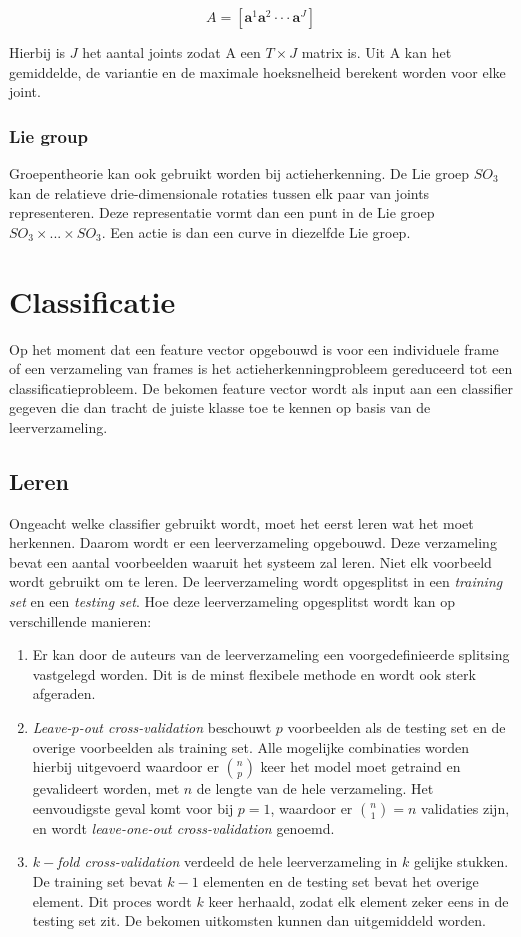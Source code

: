 $$A = [\textbf{a}^1\textbf{a}^2 \cdot\cdot\cdot \textbf{a}^J]$$

Hierbij is $J$ het aantal joints zodat A een $T \times J$ matrix is. Uit A kan het gemiddelde, de variantie en de maximale hoeksnelheid berekent worden voor elke joint. 

\subsection{Lie group}
Groepentheorie kan ook gebruikt worden bij actieherkenning. De Lie groep $SO_3$ kan de relatieve drie-dimensionale rotaties tussen elk paar van joints representeren. Deze representatie vormt dan een punt in de Lie groep $SO_3 \times ... \times SO_3$. Een actie is dan een curve in diezelfde Lie groep.


\chapter{Classificatie}
Op het moment dat een feature vector opgebouwd is voor een individuele frame of een verzameling van frames is het actieherkenningprobleem gereduceerd tot een classificatieprobleem. De bekomen feature vector wordt als input aan een classifier gegeven die dan tracht de juiste klasse toe te kennen op basis van de leerverzameling. 

\section{Leren}
Ongeacht welke classifier gebruikt wordt, moet het eerst leren wat het moet herkennen. Daarom wordt er een leerverzameling opgebouwd. Deze verzameling bevat een aantal voorbeelden waaruit het systeem zal leren. Niet elk voorbeeld wordt gebruikt om te leren. De leerverzameling wordt opgesplitst in een \textit{training set} en een \textit{testing set}. Hoe deze leerverzameling opgesplitst wordt kan op verschillende manieren:
\begin{enumerate}
	\item Er kan door de auteurs van de leerverzameling een voorgedefinieerde splitsing vastgelegd worden. Dit is de minst flexibele methode en wordt ook sterk afgeraden. 
	\item \textit{Leave-$p$-out cross-validation} beschouwt $p$ voorbeelden als de testing set en de overige voorbeelden als training set. Alle mogelijke combinaties worden hierbij uitgevoerd waardoor er $\binom{n}{p}$ keer het model moet getraind en gevalideert worden, met $n$ de lengte van de hele verzameling. Het eenvoudigste geval komt voor bij $p = 1$, waardoor er $\binom{n}{1} = n$ validaties zijn, en wordt \textit{leave-one-out cross-validation} genoemd.
	\item \textit{$k-$fold cross-validation} verdeeld de hele leerverzameling in $k$ gelijke stukken. De training set bevat $k - 1$ elementen en de testing set bevat het overige element. Dit proces wordt $k$ keer herhaald, zodat elk element zeker eens in de testing set zit. De bekomen uitkomsten kunnen dan uitgemiddeld worden.	
\end{enumerate} 





